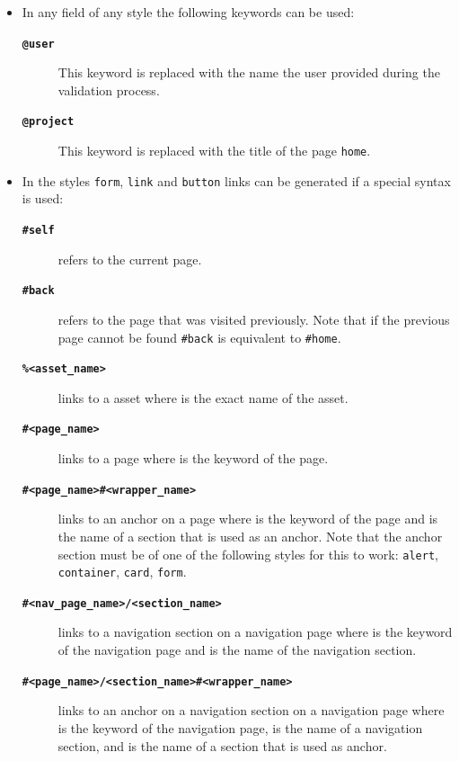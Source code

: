 \documentclass[a4paper,oneside]{book}
\begin{document}
\begin{itemize}
    \item In any field of any style the following keywords can be used:
        \begin{description}
            \item[\textbf{\texttt{@user}}] This keyword is replaced with the name the user provided during the validation process.
            \item[\textbf{\texttt{@project}}] This keyword is replaced with the title of the page \texttt{home}.
        \end{description}
    \item In the styles \texttt{form}, \texttt{link} and \texttt{button} links can be generated if a special syntax is used:
        \begin{description}
            \item[\textbf{\texttt{\#self}}] refers to the current page.
            \item[\textbf{\texttt{\#back}}] refers to the page that was visited previously.
                Note that if the previous page cannot be found \texttt{\#back} is equivalent to \texttt{\#home}.
            \item[\textbf{\texttt{\%<asset\_name>}}] links to a asset where  is the exact name of the asset.
            \item[\textbf{\texttt{\#<page\_name>}}] links to a page where  is the keyword of the page.
            \item[\textbf{\texttt{\#<page\_name>\#<wrapper\_name>}}] links to an anchor on a page where  is the keyword of the page and  is the name of a section that is used as an anchor.
                Note that the anchor section must be of one of the following styles for this to work: \texttt{alert}, \texttt{container}, \texttt{card}, \texttt{form}.
            \item[\textbf{\texttt{\#<nav\_page\_name>/<section\_name>}}] links to a navigation section on a navigation page where  is the keyword of the navigation page and  is the name of the navigation section.
            \item[\textbf{\texttt{\#<page\_name>/<section\_name>\#<wrapper\_name>}}] links to an anchor on a navigation section on a navigation page where  is the keyword of the navigation page,  is the name of a navigation section, and  is the name of a section that is used as anchor.

\end{description}
\end{itemize}
\end{document}
